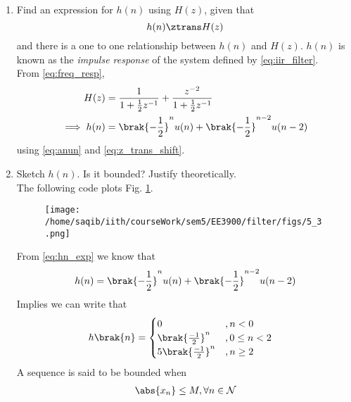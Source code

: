 \documentclass[journal,12pt,twocolumn]{IEEEtran}
\renewcommand\thesection{\arabic{section}}
\begin{document}
\begin{enumerate}[label=\thesection.\arabic*]
\item \label{prob:impulse_resp}
Find an expression for $h(n)$ using $H(z)$, given that 
\begin{equation}
\label{eq:impulse_resp}
h(n) \ztrans H(z)
\end{equation}
and there is a one to one relationship between $h(n)$ and $H(z)$. $h(n)$ is known as the {\em impulse response} of the
system defined by \eqref{eq:iir_filter}.
\\
\solution From \eqref{eq:freq_resp},
\begin{align}
H(z) &= \frac{1}{1 + \frac{1}{2}z^{-1}} + \frac{ z^{-2}}{1 + \frac{1}{2}z^{-1}}
\\
\implies h(n) &= \brak{-\frac{1}{2}}^{n}u(n) + \brak{-\frac{1}{2}}^{n-2}u(n-2)
\label{eq:hn_exp}
\end{align}
using \eqref{eq:anun} and \eqref{eq:z_trans_shift}.
\item Sketch $h(n)$. Is it bounded? Justify theoretically.
\\
\solution The following code plots Fig. \ref{fig:xnyn}.

\begin{figure}[!ht]
	\begin{center}
	\texttt{[image: /home/saqib/iith/courseWork/sem5/EE3900/filter/figs/5\_3.png]}
	\end{center}
	\label{fig:xnyn}	
\end{figure}
From \eqref{eq:hn_exp} we know that\\
\begin{equation}
	h(n) = \brak{-\frac{1}{2}}^{n}u(n) + \brak{-\frac{1}{2}}^{n-2}u(n-2)
\end{equation}
Implies we can write that\\
\begin{align}
	h\brak{n} &= \begin{cases}
					 0 &, n < 0\\
					 \brak{\frac{-1}{2}}^n &, 0\leq n<2\\
					 5\brak{\frac{-1}{2}}^n &, n \geq 2
				  \end{cases}\label{eq:hn_theoritical_def}
\end{align}
A sequence is said to be bounded when 
\begin{align}
	\abs{x_n} \leq M , \forall n \in \mathcal{N}\label{def:bounded_seq_def}
\end{align}  


\end{enumerate}
\end{document}
